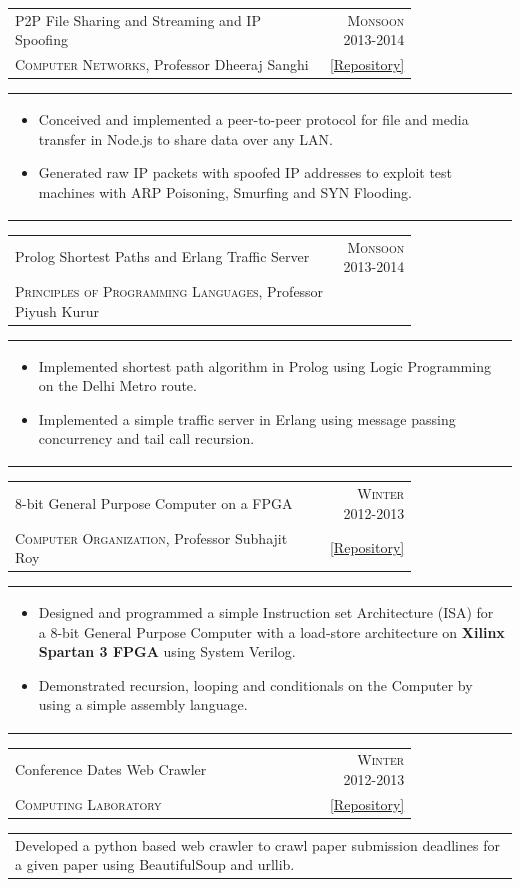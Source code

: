 \documentclass[a4paper,10pt]{article} %
\newcommand{\cproject}[5]{
    \begin{tabular}{p{0.80\linewidth}r}
        \textcolor{NavyBlue}{#2} & \multicolumn{1}{m{4cm}}{\raggedleft \textsc{#1}}\\
        #3 & #4
    \end{tabular}
    \begin{tabular}{p{\linewidth}}
    \vspace{-0.3cm}
        \footnotesize{#5}
    \end{tabular}
    \vspace{-0.5cm}
}
\newcommand{\scproject}[5]{
    \begin{tabular}{p{0.80\linewidth}r}
        \textcolor{NavyBlue}{#2} & \multicolumn{1}{m{4cm}}{\raggedleft \textsc{#1}}\\
        #3 & #4
    \end{tabular}
    \begin{tabular}{p{\linewidth}}
    \vspace{-0.3cm}
        \footnotesize{#5}
    \end{tabular}
    \vspace{-0.3cm}
}
\begin{document}
\cproject
    {Monsoon 2013-2014}
    {P2P File Sharing and Streaming and IP Spoofing}
    {\textsc{Computer Networks}, Professor Dheeraj Sanghi}
    { \href{https://github.com/srijanshetty/nodesock}{ \footnotesize{[Repository]} } }
    {
        \begin{itemize}[leftmargin=0.5cm]
            \item Conceived and implemented a peer-to-peer protocol for file and media transfer in Node.js to share
                data over any LAN.
            \item Generated raw IP packets with spoofed IP addresses to exploit test machines with ARP Poisoning,
                Smurfing and SYN Flooding.
        \end{itemize}
    }

\cproject
    {Monsoon 2013-2014}
    {Prolog Shortest Paths and Erlang Traffic Server}
    {\textsc{Principles of Programming Languages}, Professor Piyush Kurur}
    {}
    {
       \begin{itemize}[leftmargin=0.5cm]
           \item Implemented shortest path algorithm in Prolog using Logic Programming on the Delhi Metro route.
           \item Implemented a simple traffic server in Erlang using message passing concurrency and tail call recursion.
       \end{itemize}
    }

\cproject
    {Winter 2012-2013}
    {8-bit General Purpose Computer on a FPGA}
    {\textsc{Computer Organization}, Professor Subhajit Roy}
    { \href{https://github.com/srijanshetty/220\_y11} {\footnotesize{[Repository]}} }
    {
      \begin{itemize}[leftmargin=0.5cm]
          \item Designed and programmed a simple Instruction set Architecture (ISA) for a 8-bit General Purpose Computer with a load-store
              architecture on \textbf{Xilinx Spartan 3 FPGA} using System Verilog.
          \item Demonstrated recursion, looping and conditionals on the Computer by using a simple assembly language.
      \end{itemize}
    }

\scproject
    {Winter 2012-2013}
    {Conference Dates Web Crawler}
    {\textsc{Computing Laboratory}}
    {\href{https://github.com/srijanshetty/crawler} {\footnotesize{ [Repository]}} }
    {
           Developed a python based web crawler to crawl paper submission deadlines for a given paper using BeautifulSoup and
           urllib.

    }
\end{document}
